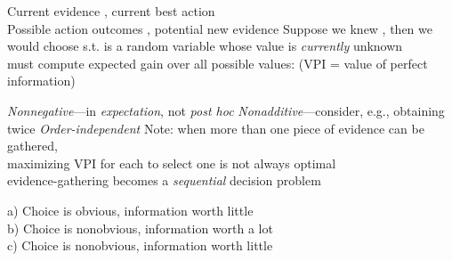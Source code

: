 \documentclass{article}
\begin{document}
\begin{huge}
Current evidence , current best action \mat{$\alpha$}\\
Possible action outcomes , potential new evidence 
\mat{\[
  EU(\alpha|E) = \max_{a} \mysum_i\ U(S_i)\;P(S_i|E,a)
\]}
Suppose we knew , then we would choose  s.t.
\mat{\[
  EU(\alpha_{e_{jk}}|E,E_j \eq e_{jk}) = \max_a \mysum_i\ U(S_i)\;P(S_i|E,a,E_j \eq e_{jk})
\]}
 is a random variable whose value is {\it currently} unknown\\
\mat{$\implies$} must compute expected gain over all possible values:
\mat{\[
VPI_{E}(E_j) = \left(\mysum_k\ P(E_j \eq e_{jk}|E)
EU(\alpha_{e_{jk}}|E,E_j \eq e_{jk})\right) - EU(\alpha|E) 
\]}
(VPI = value of perfect information)



\emph{Nonnegative}---in \emph{expectation}, not \emph{post hoc}
\emph{Nonadditive}---consider, e.g., obtaining  twice
\mat{\[
VPI_{E}(E_j,E_k) \not= VPI_{E}(E_j) + VPI_{E}(E_k)
\]}
\emph{Order-independent}
\mat{\[
VPI_{E}(E_j,E_k) = VPI_{E}(E_j) + VPI_{E,E_j}(E_k)
                   = VPI_{E}(E_k) + VPI_{E,E_k}(E_j) 
\]}
Note: when more than one piece of evidence can be gathered,\\
maximizing VPI for each to select one is not always optimal\\
\mat{$\implies$} evidence-gathering becomes a \emph{sequential} decision problem



\heading{Qualitative behaviors}

a) Choice is obvious, information worth little\\
b) Choice is nonobvious, information worth a lot\\
c) Choice is nonobvious, information worth little

\vspace*{-0.2in} %

\textwidth
{}





\end{huge} 
\end{document}
